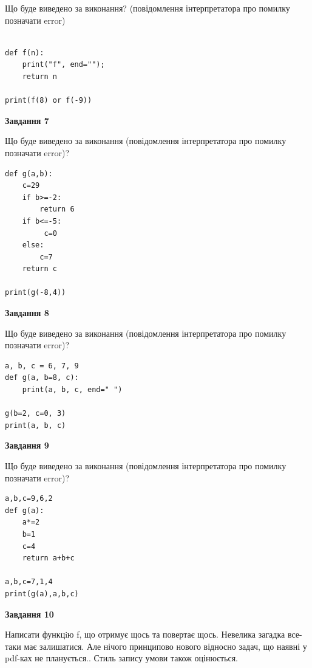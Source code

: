 \documentclass[12pt, ukrainian]{article}
\begin{document}
{\begin {large}
Що буде виведено за виконання? (повідомлення інтерпретатора про помилку позначати error)\par
\begin{verbatim}

def f(n):
    print("f", end="");
    return n

print(f(8) or f(-9))
\end{verbatim}

{\begin {center}\textbf{Завдання 7}\end {center}}

Що буде виведено за виконання (повідомлення інтерпретатора про помилку позначати error)?\par
\begin{verbatim}
def g(a,b):
    c=29
    if b>=-2:
        return 6
    if b<=-5:
         c=0
    else: 
        c=7
    return c

print(g(-8,4))
\end{verbatim}

{\begin {center}\textbf{Завдання 8}\end {center}}

Що буде виведено за виконання (повідомлення інтерпретатора про помилку позначати error)?\par
\begin{verbatim}
a, b, c = 6, 7, 9
def g(a, b=8, c):
    print(a, b, c, end=" ")

g(b=2, c=0, 3)
print(a, b, c)
\end{verbatim}

{\begin {center}\textbf{Завдання 9}\end {center}}

Що буде виведено за виконання (повідомлення інтерпретатора про помилку позначати error)?\par
\begin{verbatim}
a,b,c=9,6,2
def g(a):
    a*=2
    b=1
    c=4
    return a+b+c

a,b,c=7,1,4
print(g(a),a,b,c)
\end{verbatim}

{\begin {center}\textbf{Завдання 10}\end {center}}


Написати функцiю f, що отримує щось та повертає щось. Невелика загадка все-таки має залишатися. Але нічого принципово нового відносно задач, що наявні у pdf-ках не планується.. Стиль запису умови також оцінюється.\par
\end {large}}
\newpage
\end{document}
